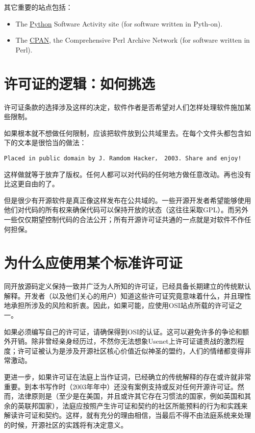 \documentclass[12pt,oneside]{ctexbook}
\begin{document}
\begin{common-format}
其它重要的站点包括：
\begin{itemize}
\item The \href{http://www.python.org/}{Python} Software Activity site (for software written in Pyth-on).
\item The \href{http://language.perl.com/CPAN}{CPAN}, the Comprehensive Perl Archive Network (for software written in Perl).
\end{itemize}

\section{许可证的逻辑：如何挑选}
许可证条款的选择涉及这样的决定，软件作者是否希望对人们怎样处理软件施加某些限制。

如果根本就不想做任何限制，应该把软件放到公共域里去。在每个文件头都包含如下的文本是很恰当的做法：
\begin{Verbatim}
Placed in public domain by J. Ramdom Hacker， 2003. Share and enjoy!
\end{Verbatim}

这样做就等于放弃了版权。任何人都可以对代码的任何地方做任意改动。再也没有比这更自由的了。

但是很少有开源软件是真正像这样发布在公共域的。一些开源开发者希望能够使用他们对代码的所有权来确保代码可以保持开放的状态（这往往采取GPL）。而另外一些仅仅期望控制代码的合法公开；所有开源许可证共通的一点就是对软件不作任何担保。

\section{为什么应使用某个标准许可证}
同开放源码定义保持一致并广泛为人所知的许可证，已经具备长期建立的传统默认解释。开发者（以及他们关心的用户）知道这些许可证究竟意味着什么，并且理性地承担所涉及的风险和折衷。因此，如果可能，应使用OSI站点所载的许可证之一。

如果必须编写自己的许可证，请确保得到OSI的认证。这可以避免许多的争论和额外开销。除非曾经亲身经历过，不然你无法想象Usenet上许可证谴责战的激烈程度；许可证被认为是涉及开源社区核心价值近似神圣的盟约，人们的情绪都变得非常激动。

更进一步，如果许可证在法庭上当作证词，已经确立的传统解释的存在或许就非常重要。到本书写作时（2003年年中）还没有案例支持或反对任何开源许可证。然而，法律原则是（至少是在美国，并且或许其它存在习惯法的国家，例如英国和其余的英联邦国家），法庭应按照产生许可证和契约的社区所能预料的行为和实践来解读许可证和契约。这样，就有充分的理由相信，当最后不得不由法庭系统来处理的时候，开源社区的实践将有决定意义。


\end{common-format}
\end{document}
